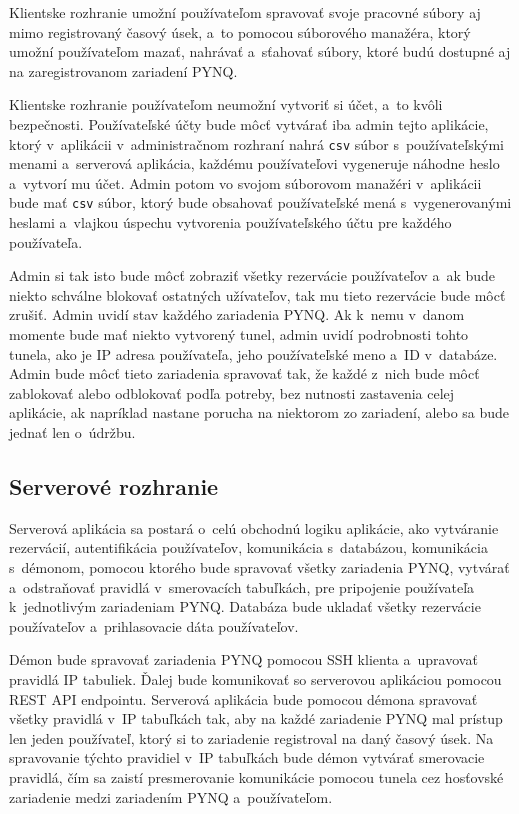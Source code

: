 Klientske rozhranie umožní používateľom spravovať svoje pracovné súbory aj mimo registrovaný časový úsek, a~to pomocou súborového manažéra, ktorý umožní používateľom mazať, nahrávať a~sťahovať súbory, ktoré budú dostupné aj na zaregistrovanom zariadení PYNQ.

Klientske rozhranie používateľom neumožní vytvoriť si účet, a~to kvôli bezpečnosti. Používateľské účty bude môcť vytvárať iba admin tejto aplikácie, ktorý v~aplikácii v~administračnom rozhraní nahrá \verb|csv| súbor s~používateľskými menami a~serverová aplikácia, každému používateľovi vygeneruje náhodne heslo a~vytvorí mu účet. Admin potom vo svojom súborovom manažéri v~aplikácii bude mať \verb|csv| súbor, ktorý bude obsahovať používateľské mená s~vygenerovanými heslami a~vlajkou úspechu vytvorenia používateľského účtu pre každého používateľa.

Admin si tak isto bude môcť zobraziť všetky rezervácie používateľov a~ak bude niekto schválne blokovať ostatných užívateľov, tak mu tieto rezervácie bude môcť zrušiť. Admin uvidí stav každého zariadenia PYNQ. Ak k~nemu v~danom momente bude mať niekto vytvorený tunel, admin uvidí podrobnosti tohto tunela, ako je IP adresa používateľa, jeho používateľské meno a~ID v~databáze. Admin bude môcť tieto zariadenia spravovať tak, že každé z~nich bude môcť zablokovať alebo odblokovať podľa potreby, bez nutnosti zastavenia celej aplikácie, ak napríklad nastane porucha na niektorom zo zariadení, alebo sa bude jednať len o~údržbu.

\subsection{Serverové rozhranie}

Serverová aplikácia sa postará o~celú obchodnú logiku aplikácie, ako vytváranie rezervácií, autentifikácia používateľov, komunikácia s~databázou, komunikácia s~démonom, pomocou ktorého bude spravovať všetky zariadenia PYNQ, vytvárať a~odstraňovať pravidlá v~smerovacích tabuľkách, pre pripojenie používateľa k~jednotlivým zariadeniam PYNQ. Databáza bude ukladať všetky rezervácie používateľov a~prihlasovacie dáta používateľov. 

Démon bude spravovať zariadenia PYNQ pomocou SSH klienta a~upravovať pravidlá IP tabuliek. Ďalej bude komunikovať so serverovou aplikáciou pomocou REST API endpointu. Serverová aplikácia bude pomocou démona spravovať všetky pravidlá v~IP tabuľkách tak, aby na každé zariadenie PYNQ mal prístup len jeden používateľ, ktorý si to zariadenie registroval na daný časový úsek. Na spravovanie týchto pravidiel v~IP tabuľkách bude démon vytvárať smerovacie pravidlá, čím sa zaistí presmerovanie komunikácie pomocou tunela cez hosťovské zariadenie medzi zariadením PYNQ a~používateľom.

